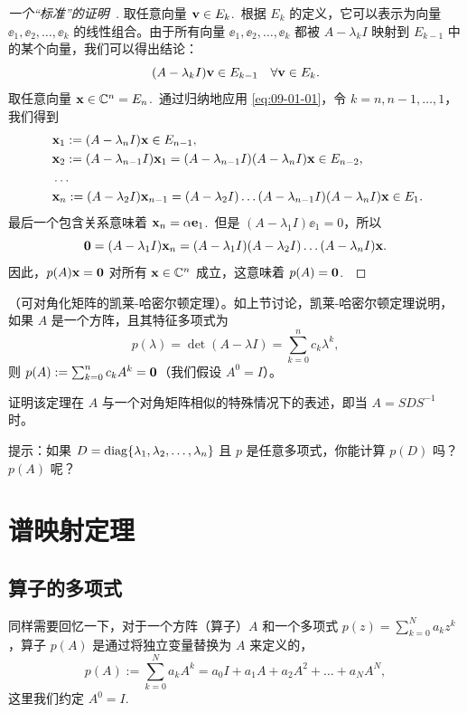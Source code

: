 \begin{proof}[\normalfont\heiti 一个“标准”的证明~\nopunct]
取任意向量 $\mathbf{v} \in E_k$.~根据 $E_k$ 的定义，它可以表示为向量 $\ee_1, \ee_2, \dots, \ee_k$ 的线性组合。由于所有向量 $\ee_1, \ee_2, \dots, \ee_k$ 都被 $A - \lambda_k I$ 映射到 $E_{k-1}$ 中的某个向量，我们可以得出结论：
\begin{equation}\label{eq:09-01-01}
(A - \lambda_k I)\mathbf{v} \in E_{k-1} \quad \forall \mathbf{v} \in E_k.
\end{equation}
取任意向量 $\mathbf{x} \in \mathbb{C}^n = E_n$.~通过归纳地应用 \eqref{eq:09-01-01}，令 $k = n, n-1, \dots, 1$，我们得到
\begin{equation} \notag
\begin{split}
&\ \mathbf{x}_1 := (A - \lambda_n I)\mathbf{x} \in E_{n-1},\\
&\ \mathbf{x}_2 := (A - \lambda_{n-1} I)\mathbf{x}_1 = (A - \lambda_{n-1} I)(A - \lambda_n I)\mathbf{x} \in E_{n-2},\\
&\ \dots \\
&\ \mathbf{x}_n := (A - \lambda_2 I)\mathbf{x}_{n-1} = (A - \lambda_2 I) \dots (A - \lambda_{n-1} I)(A - \lambda_n I)\mathbf{x} \in E_1.
\end{split}\end{equation}
最后一个包含关系意味着 $\mathbf{x}_n = \alpha \mathbf{e}_1$.~但是 $(A - \lambda_1 I)\ee_1 = 0$，所以
$$\mathbf{0} = (A - \lambda_1 I)\mathbf{x}_n = (A - \lambda_1 I)(A - \lambda_2 I) \dots (A - \lambda_n I)\mathbf{x}.$$
因此，$p(A)\mathbf{x} = \mathbf{0}$ 对所有 $\mathbf{x} \in \mathbb{C}^n$ 成立，这意味着 $p(A) = \mathbf{0}$.~\end{proof}

\begin{problemset}
\item \label{ex:09-01-01} （可对角化矩阵的凯莱-哈密尔顿定理）。如上节讨论，凯莱-哈密尔顿定理说明，如果 $A$ 是一个方阵，且其特征多项式为
$$p(\lambda) = \det(A - \lambda I) = \sum_{k=0}^n c_k \lambda^k,$$
则 $p(A) := \sum_{k=0}^n c_k A^k = \mathbf{0}$（我们假设 $A^0 = I$）。

证明该定理在 $A$ 与一个对角矩阵相似的特殊情况下的表述，即当 $A = SDS^{-1}$ 时。

{\heiti 提示}：如果 $D = \operatorname{diag}\{\lambda_1, \lambda_2, \dots, \lambda_n\}$ 且 $p$ 是任意多项式，你能计算 $p(D)$ 吗？$p(A)$ 呢？
\end{problemset}

\section{谱映射定理}\label{sec:09-02}

\subsection{算子的多项式}\label{sec:09-02-01}
同样需要回忆一下，对于一个方阵（算子）$A$ 和一个多项式 $p(z) = \sum_{k=0}^N a_k z^k$，算子 $p(A)$ 是通过将独立变量替换为 $A$ 来定义的，
$$p(A) := \sum_{k=0}^N a_k A^k = a_0 I + a_1 A + a_2 A^2 + \dots + a_N A^N,$$
这里我们约定 $A^0 = I$.~

